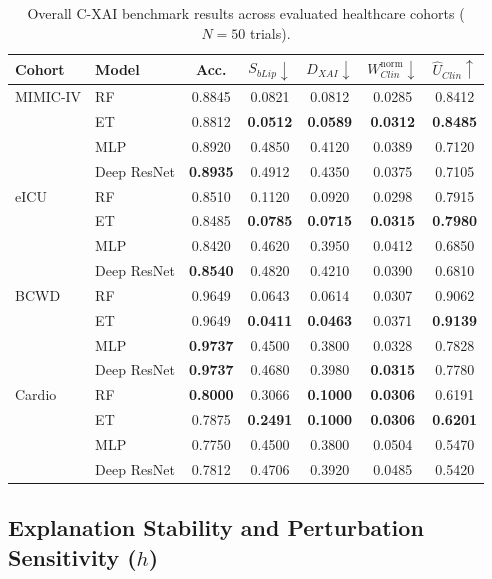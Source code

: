 \documentclass[3p,times,procedia]{elsarticle}
\theoremstyle{definition}
\begin{document}
\begin{table}[h]
\centering
\small
\caption{Overall C-XAI benchmark results across evaluated healthcare cohorts ($N=50$ trials).}
\label{tab:overall_results}
\begin{tabular}{llccccc}
\toprule
Cohort & Model & Acc. & $S_{bLip}\downarrow$ & $D_{XAI}\downarrow$ & $W_{Clin}^{\mathrm{norm}}\downarrow$ & $\widehat{U}_{Clin}\uparrow$ \\
\midrule
MIMIC-IV & RF  & 0.8845 & 0.0821 & 0.0812 & 0.0285 & 0.8412 \\
         & ET  & 0.8812 & \textbf{0.0512} & \textbf{0.0589} & \textbf{0.0312} & \textbf{0.8485} \\
         & MLP & 0.8920 & 0.4850 & 0.4120 & 0.0389 & 0.7120 \\
         & Deep ResNet & \textbf{0.8935} & 0.4912 & 0.4350 & 0.0375 & 0.7105 \\
\midrule
eICU     & RF  & 0.8510 & 0.1120 & 0.0920 & 0.0298 & 0.7915 \\
         & ET  & 0.8485 & \textbf{0.0785} & \textbf{0.0715} & \textbf{0.0315} & \textbf{0.7980} \\
         & MLP & 0.8420 & 0.4620 & 0.3950 & 0.0412 & 0.6850 \\
         & Deep ResNet & \textbf{0.8540} & 0.4820 & 0.4210 & 0.0390 & 0.6810 \\
\midrule
BCWD     & RF  & 0.9649 & 0.0643 & 0.0614 & 0.0307 & 0.9062 \\
         & ET  & 0.9649 & \textbf{0.0411} & \textbf{0.0463} & 0.0371 & \textbf{0.9139} \\
         & MLP & \textbf{0.9737} & 0.4500 & 0.3800 & 0.0328 & 0.7828 \\
         & Deep ResNet & \textbf{0.9737} & 0.4680 & 0.3980 & \textbf{0.0315} & 0.7780 \\
\midrule
Cardio   & RF  & \textbf{0.8000} & 0.3066 & \textbf{0.1000} & \textbf{0.0306} & 0.6191 \\
         & ET  & 0.7875 & \textbf{0.2491} & \textbf{0.1000} & \textbf{0.0306} & \textbf{0.6201} \\
         & MLP & 0.7750 & 0.4500 & 0.3800 & 0.0504 & 0.5470 \\
         & Deep ResNet & 0.7812 & 0.4706 & 0.3920 & 0.0485 & 0.5420 \\
\bottomrule
\end{tabular}
\end{table}

\subsection{Explanation Stability and Perturbation Sensitivity ($h$)}
\end{document}
